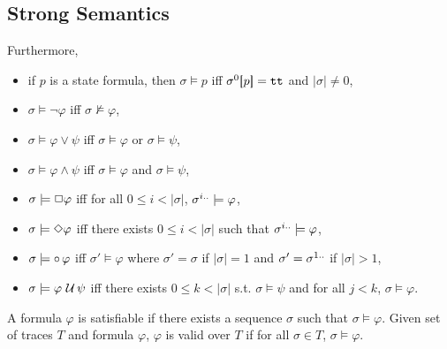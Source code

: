 \documentclass[12pt,a4paper,titlepage]{article}
\theoremstyle{break}
\begin{document}
\subsection{Strong Semantics}
Furthermore,
  \begin{itemize}
\item if $p$ is a state formula, then \(\sigma\models p\) iff \(\sigma^0\lsquarebracket p\rsquarebracket=\true\) and \(|\sigma|\neq 0\),
\item \(\sigma\models\neg\varphi\) iff \(\sigma\not\models\varphi\),
\item \(\sigma\models\varphi\vee\psi\) iff \(\sigma\models\varphi\) or \(\sigma\models\psi\),
\item \(\sigma\models\varphi\wedge\psi\) iff \(\sigma\models\varphi\) and \(\sigma\models\psi\),
\item \(\sigma\models\ltlbox\varphi\) iff for all \(0\leq i<|\sigma|\), \(\suffix{\sigma}{i}\models\varphi\),
\item \(\sigma\models\ltldiammond\varphi\) iff there exists \(0\leq i<|\sigma|\) such that \(\suffix{\sigma}{i}\models\varphi\),
\item \(\sigma\models\ltlnext\varphi\) iff \(\sigma'\models\varphi\) where \(\sigma'=\sigma\) if \(|\sigma| =1\) and \(\sigma'=\suffix{\sigma}{1}\) if \(|\sigma|>1\),
\item \(\sigma\models\varphi\ltluntil\psi\) iff there exists \(0\leq k<|\sigma|\) s.t. \(\sigma\models\psi\) and for all \(j<k\), \(\sigma\models\varphi\).
  \end{itemize}

A formula \(\varphi\) is satisfiable if there exists a sequence \(\sigma\) such that \(\sigma\models \varphi\).
Given set of traces $T$ and formula \(\varphi\), \(\varphi\) is valid over $T$ if for all \(\sigma\in T\), \(\sigma\models\varphi\).
\end{document}
